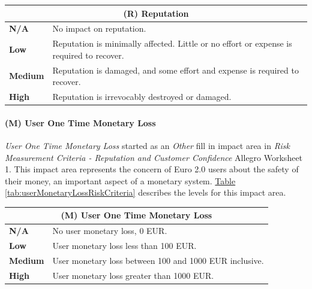 \documentclass[a4paper,12pt]{article} %
\newcommand{\hypertableref}[1]{\hyperref[#1]{Table \ref{#1}}}
\begin{document}
{\begin{center}
\begin{tabular}{ | l | p{12cm} | }
  \hline
  \multicolumn{2}{|c|}{\textbf{(R) Reputation}}
  \\ \hline
  \textbf{N/A} & No impact on reputation.
  \\ \hline
  \textbf{Low} & Reputation is minimally affected. Little or no effort or expense is required to recover.
  \\ \hline
  \textbf{Medium} & Reputation is damaged, and some effort and expense is required to recover.
  \\ \hline
  \textbf{High} & Reputation is irrevocably destroyed or damaged.
  \\ \hline
\end{tabular}
\end{center}
\label{tab:reputationRiskCriteria}

\paragraph{(M) User One Time Monetary Loss}

\textit{User One Time Monetary Loss} started as an \textit{Other} fill in impact area in \textit{Risk Measurement Criteria - Reputation and Customer Confidence} Allegro Worksheet 1. This impact area represents the concern of Euro 2.0 users about the safety of their money, an important aspect of a monetary system. \hypertableref{tab:userMonetaryLossRiskCriteria} describes the levels for this impact area.

\begin{center}
\begin{tabular}{ | l | p{12cm} | }
  \hline
  \multicolumn{2}{|c|}{\textbf{(M) User One Time Monetary Loss}}
  \\ \hline
  \textbf{N/A} & No user monetary loss, 0 EUR.
  \\ \hline
  \textbf{Low} & User monetary loss less than 100 EUR.
  \\ \hline
  \textbf{Medium} & User monetary loss between 100 and 1000 EUR inclusive.
  \\ \hline
  \textbf{High} & User monetary loss greater than 1000 EUR.
  \\ \hline
\end{tabular}
\end{center}
\label{tab:userMonetaryLossRiskCriteria}

}
\end{document}
